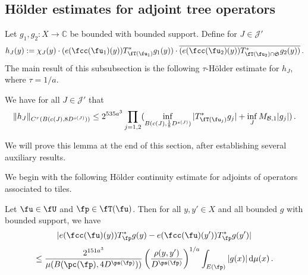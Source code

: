 \subsection{H\"older estimates for adjoint tree operators}
\label{subsubsec-holder-estimates}
    Let $g_1, g_2:X \to \mathbb{C}$ be bounded with bounded support.
    Define for $J \in \mathcal{J}'$
    \begin{equation}
        \label{def-hj}
        h_J(y) := \chi_J(y)\cdot(e(\fcc(\fu_1)(y)) T_{\fT(\fu_1)}^* g_1(y)) \cdot \overline{(e(\fcc(\fu_2)(y)) T_{\fT(\fu_2) \cap \mathfrak{S}}^* g_2(y))}\,.
    \end{equation}
    The main result of this subsubsection is the following $\tau$-H\"older estimate for $h_J$, where $\tau = 1/a$.

    \begin{lemma}
        \label{Holder-correlation-tree}
        We have for all $J \in \mathcal{J}'$ that
        \begin{equation}
            \label{hHolder}
            \|h_J\|_{C^{\tau}(B(c(J), 8D^{s(J)}))} \le 2^{535a^3} \prod_{j = 1,2} (\inf_{B(c(J), \frac{1}{8}D^{s(J)})} |T_{\fT(\fu_j)}^* g_j| + \inf_J M_{\mathcal{B}, 1} |g_j|)\,.
        \end{equation}
    \end{lemma}

    We will prove this lemma at the end of this section, after establishing several auxiliary results.

    We begin with the following H\"older continuity estimate for adjoints of operators associated to tiles.
    \begin{lemma}
        \label{Holder-correlation-tile}
        Let $\fu \in \fU$ and $\fp \in \fT(\fu)$. Then for all $y, y' \in X$ and all bounded $g$ with bounded support, we have
        $$
            |e(\fcc(\fu)(y)) T_{\fp}^* g(y) - e(\fcc(\fu)(y')) T_{\fp}^* g(y')|
        $$
        \begin{equation}
            \label{T*Holder2}
            \le \frac{2^{151a^3}}{\mu(B(\pc(\fp), 4D^{\ps(\fp)}))} \left(\frac{\rho(y, y')}{D^{\ps(\fp)}}\right)^{1/a} \int_{E(\fp)} |g(x)| \, \mathrm{d}\mu(x)\,.
        \end{equation}
    \end{lemma}

